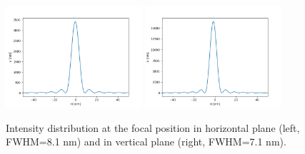 \documentclass{iucr}              %
\begin{document}
\begin{table}[]
    \centering
    \caption{Beam sizes calculated with simplified wave optics propagation (point source and ideal lenses with aperture for modeling the element dimensions). The zoom or scaling factor used for the propagation is also displayed. 
    }
    \label{tablewofry1D}
\end{table}

\begin{figure}
\label{wofry1D}
\centering
\includegraphics[width=0.45\textwidth]{GRAPHICS/wofry1Dh.png}
\includegraphics[width=0.45\textwidth]{GRAPHICS/wofry1Dv.png}
\caption{Intensity distribution at the focal position in horizontal plane (left, FWHM=8.1 nm) and in vertical plane (right, FWHM=7.1 nm). 
}
\end{figure}
\end{document}
